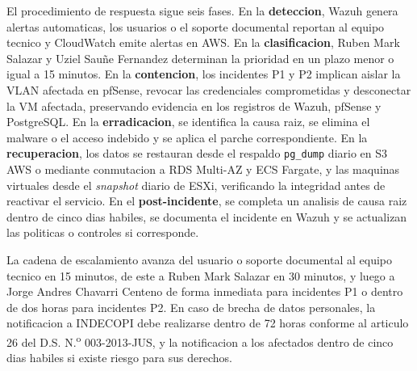 \documentclass[11pt, a4paper, oneside]{report}
\begin{document}
El procedimiento de respuesta sigue seis fases. En la \textbf{deteccion}, Wazuh genera alertas automaticas, los usuarios o el soporte documental reportan al equipo tecnico y CloudWatch emite alertas en AWS. En la \textbf{clasificacion}, Ruben Mark Salazar y Uziel Sauñe Fernandez determinan la prioridad en un plazo menor o igual a 15 minutos. En la \textbf{contencion}, los incidentes P1 y P2 implican aislar la VLAN afectada en pfSense, revocar las credenciales comprometidas y desconectar la VM afectada, preservando evidencia en los registros de Wazuh, pfSense y PostgreSQL. En la \textbf{erradicacion}, se identifica la causa raiz, se elimina el malware o el acceso indebido y se aplica el parche correspondiente. En la \textbf{recuperacion}, los datos se restauran desde el respaldo \texttt{pg\_dump} diario en S3 AWS o mediante conmutacion a RDS Multi-AZ y ECS Fargate, y las maquinas virtuales desde el \textit{snapshot} diario de ESXi, verificando la integridad antes de reactivar el servicio. En el \textbf{post-incidente}, se completa un analisis de causa raiz dentro de cinco dias habiles, se documenta el incidente en Wazuh y se actualizan las politicas o controles si corresponde.

La cadena de escalamiento avanza del usuario o soporte documental al equipo tecnico en 15 minutos, de este a Ruben Mark Salazar en 30 minutos, y luego a Jorge Andres Chavarri Centeno de forma inmediata para incidentes P1 o dentro de dos horas para incidentes P2. En caso de brecha de datos personales, la notificacion a INDECOPI debe realizarse dentro de 72 horas conforme al articulo 26 del D.S. N.\textsuperscript{o} 003-2013-JUS, y la notificacion a los afectados dentro de cinco dias habiles si existe riesgo para sus derechos.

\renewcommand{\arraystretch}{1.3}
\footnotesize
{}
\end{document}
